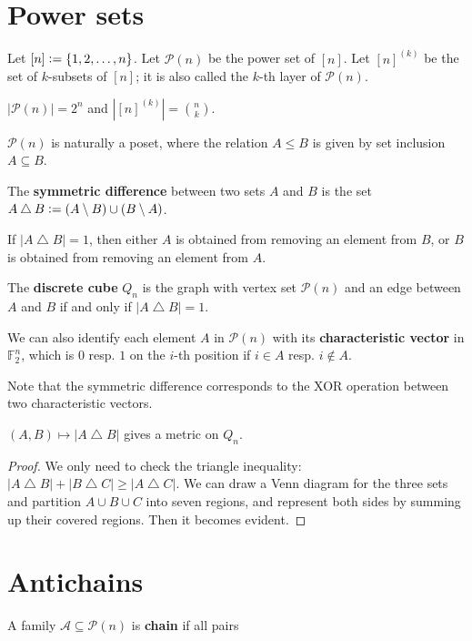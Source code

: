 \section{Power sets}


Let $[n] \vcentcolon= \left\{ 1,2, \ldots ,n \right\} $.
Let $\mathcal{P}(n)$ be the power set of $[n]$.
Let $[n]^{(k)}$ be the set of $k$-subsets of $[n]$; it is also called the $k$-th layer of $\mathcal{P}(n)$.

\begin{proposition}
  $| \mathcal{P}(n) | = 2^n$ and $| [n] ^{(k)} | = \binom{n}{k}$.  
\end{proposition}


$\mathcal{P}(n)$ is naturally a poset, where the relation $A \le B$  is given by set inclusion $A \subseteq B$. 

\begin{definition}
  The \textbf{symmetric difference} between two sets $A$ and $B$ is the set $A \bigtriangleup B \vcentcolon= (A \setminus B) \cup (B \setminus A)$. 
\end{definition}


If $| A \bigtriangleup B | = 1$, then either $A$ is obtained from removing an element from $B$, or $B$ is obtained from removing an element from $A$. 


\begin{definition}
  The \textbf{discrete cube} $Q_n$ is the graph with vertex set $\mathcal{P}(n)$ and an edge between $A$ and $B$ if and only if $| A \bigtriangleup B | = 1$.    
\end{definition}


We can also identify each element $A$ in $\mathcal{P}(n)$ with its \textbf{characteristic vector} in $\mathbb{F}^n_2$, which is $0$ resp. $1$ on the $i$-th position  if $i \in A$ resp. $i \not \in A$. 

Note that the symmetric difference corresponds to the XOR operation between two characteristic vectors.



\begin{proposition}
  $(A, B) \mapsto | A \bigtriangleup B |$ gives a metric on $Q_n$.   
\end{proposition}

\begin{proof}
  We only need to check the triangle inequality: $| A \bigtriangleup B| + |B \bigtriangleup C| \ge | A \bigtriangleup C |$. We can draw a Venn diagram for the three sets and partition $A \cup B \cup C$ into seven regions, and represent both sides by summing up their covered regions.  Then it becomes evident.
\end{proof}

\section{Antichains}

\begin{definition}
  A family $\mathcal{A} \subseteq  \mathcal{P}(n)$ is \textbf{chain} if all pairs 
\end{definition}

